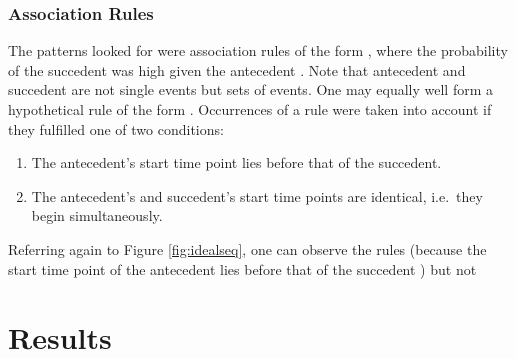\subsubsection{Association Rules}
The patterns  looked for were association rules of the form , where the probability of the succedent  was high given the antecedent . Note that antecedent and succedent are not single events but sets of events. One may equally well form a hypothetical rule of the form . Occurrences of a rule were taken into account if they fulfilled one of two conditions:

\begin{enumerate}
	\item The antecedent's start time point lies before that of the succedent.
	\item The antecedent's and succedent's start time points are identical, i.e.~they begin simultaneously.
\end{enumerate}

Referring again to Figure \ref{fig:idealseq}, one can observe the rules  (because the start time point of the antecedent  lies before that of the succedent ) but not 


\section{Results}

